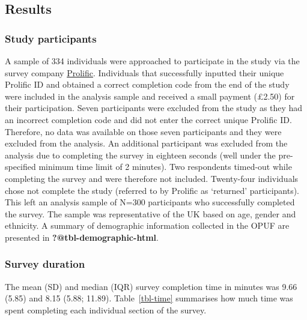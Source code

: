 \documentclass[
  letterpaper,
  DIV=11,
  numbers=noendperiod]{scrartcl}
\begin{document}
\subsection{Results}\label{results}

\subsubsection{Study participants}\label{study-participants}

A sample of 334 individuals were approached to participate in the study
via the survey company \href{https://www.prolific.com}{Prolific}.
Individuals that successfully inputted their unique Prolific ID and
obtained a correct completion code from the end of the study were
included in the analysis sample and received a small payment (£2.50) for
their participation. Seven participants were excluded from the study as
they had an incorrect completion code and did not enter the correct
unique Prolific ID. Therefore, no data was available on those seven
participants and they were excluded from the analysis. An additional
participant was excluded from the analysis due to completing the survey
in eighteen seconds (well under the pre-specified minimum time limit of
2 minutes). Two respondents timed-out while completing the survey and
were therefore not included. Twenty-four individuals chose not complete
the study (referred to by Prolific as `returned' participants). This
left an analysis sample of N=300 participants who successfully completed
the survey. The sample was representative of the UK based on age, gender
and ethnicity. A summary of demographic information collected in the
OPUF are presented in \textbf{?@tbl-demographic-html}.

\subsubsection{Survey duration}\label{survey-duration}

The mean (SD) and median (IQR) survey completion time in minutes was
9.66 (5.85) and 8.15 (5.88; 11.89). Table~\ref{tbl-time} summarises how
much time was spent completing each individual section of the survey.
\end{document}
